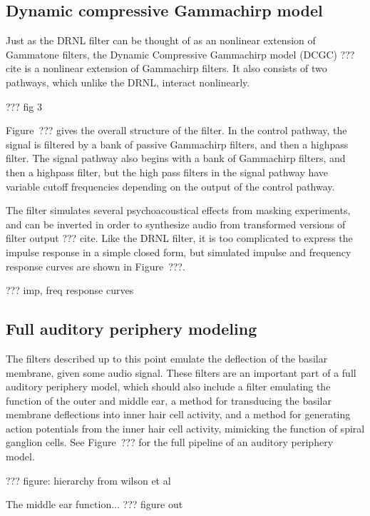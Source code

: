 \subsection{Dynamic compressive Gammachirp model}

Just as the DRNL filter can be thought of
as an nonlinear extension of Gammatone filters,
the Dynamic Compressive Gammachirp model (DCGC)
??? cite
is a nonlinear extension of Gammachirp filters.
It also consists of two pathways,
which unlike the DRNL,
interact nonlinearly.

??? fig 3

Figure~??? gives the overall structure of the filter.
In the control pathway,
the signal is filtered by
a bank of passive Gammachirp filters,
and then a highpass filter.
The signal pathway
also begins with a bank of Gammachirp filters,
and then a highpass filter,
but the high pass filters in the signal pathway
have variable cutoff frequencies
depending on the output of the control pathway.

The filter simulates
several psychoacoustical effects
from masking experiments,
and can be inverted in order to
synthesize audio
from transformed versions
of filter output
??? cite.
Like the DRNL filter, it is too complicated
to express the impulse response
in a simple closed form,
but simulated impulse and frequency response
curves are shown in Figure~???.

??? imp, freq response curves

\subsection{Full auditory periphery modeling}

The filters described up to this point
emulate the deflection
of the basilar membrane,
given some audio signal.
These filters are an important part
of a full auditory periphery model,
which should also include
a filter emulating the function
of the outer and middle ear,
a method for transducing
the basilar membrane deflections
into inner hair cell activity,
and a method for generating
action potentials from the inner hair cell activity,
mimicking the function of spiral ganglion cells.
See Figure~??? for the full pipeline
of an auditory periphery model.

??? figure: hierarchy from wilson et al

The middle ear function...
??? figure out

